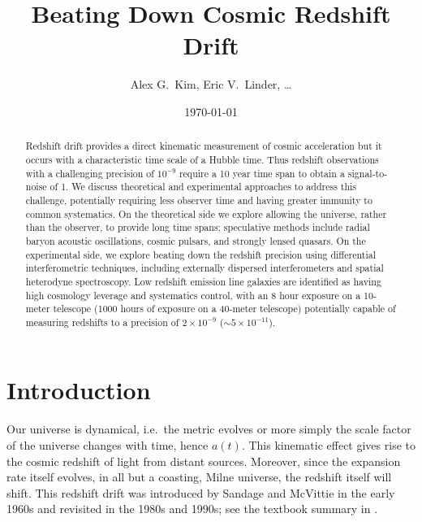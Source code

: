 \documentclass[preprint]{aastex}
\begin{document}
\title{Beating Down Cosmic Redshift Drift} 
\author{Alex G.\ Kim, Eric V.\ Linder, \dots} 

\begin{abstract} 
Redshift drift provides a direct kinematic measurement of cosmic acceleration 
but it occurs with a characteristic time scale of a Hubble time.  Thus 
redshift observations with a challenging precision of $10^{-9}$ require a 
10 year time span to obtain a signal-to-noise of 1. We discuss theoretical 
and experimental approaches to address this challenge, potentially requiring 
less observer time and having greater immunity to common systematics.  On 
the theoretical side we explore allowing the universe, rather than the 
observer, to provide long time spans; speculative methods include radial 
baryon acoustic oscillations, cosmic pulsars, and strongly lensed quasars. 
On the experimental side, we explore beating down the redshift precision 
using differential interferometric techniques, including externally 
dispersed interferometers and spatial heterodyne spectroscopy. Low 
redshift emission line galaxies are identified as having high cosmology 
leverage and systematics control, with an 8 hour exposure on a 10-meter 
telescope (1000 hours of exposure on a 40-meter telescope) potentially 
capable of measuring redshifts to a precision of $2\times 10^{-9}$ 
($\sim5\times 10^{-11}$). 
\end{abstract}

\date{\today} 

\maketitle

\section{Introduction} \label{Sec:intro} 

Our universe is dynamical, i.e.\ the metric evolves or more simply the 
scale factor of the universe changes with time, hence $a(t)$.  This 
kinematic effect 
gives rise to the cosmic redshift of light from distant sources.  Moreover, 
since the expansion rate itself evolves, in all but a coasting, Milne 
universe, the redshift itself will shift.  This redshift drift was 
introduced by Sandage \cite{sandage} and McVittie \cite{mcvittie} in the 
early 1960s and revisited in the 1980s and 1990s; see the textbook 
summary in \cite{fpoc}. 
\end{document}
